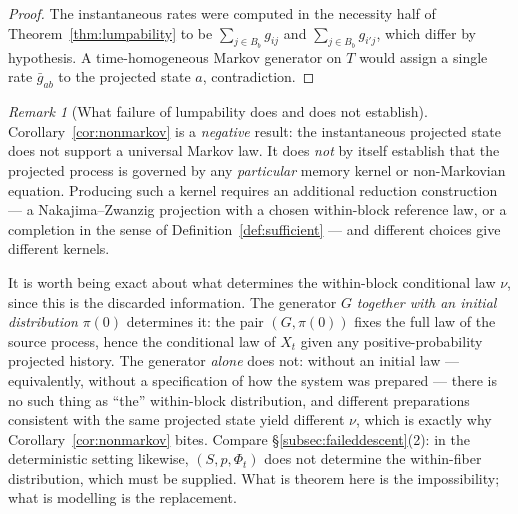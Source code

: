 \documentclass[11pt,reqno]{amsart}
\theoremstyle{plain}
\theoremstyle{definition}
\theoremstyle{remark}
\newtheorem{remark}[theorem]{Remark}
\begin{document}
\begin{proof}
The instantaneous rates were computed in the necessity half of Theorem~\ref{thm:lumpability} to be $\sum_{j\in B_b}g_{ij}$ and $\sum_{j\in B_b}g_{i'j}$, which differ by hypothesis. A time-homogeneous Markov generator on $T$ would assign a single rate $\bar g_{ab}$ to the projected state $a$, contradiction.
\end{proof}

\begin{remark}[What failure of lumpability does and does not establish]\label{rem:lumpscope}
Corollary~\ref{cor:nonmarkov} is a \emph{negative} result: the instantaneous projected state does not support a universal Markov law. It does \emph{not} by itself establish that the projected process is governed by any \emph{particular} memory kernel or non-Markovian equation. Producing such a kernel requires an additional reduction construction --- a Nakajima--Zwanzig projection with a chosen within-block reference law, or a completion in the sense of Definition~\ref{def:sufficient} --- and different choices give different kernels.

It is worth being exact about what determines the within-block conditional law $\nu$, since this is the discarded information. The generator $G$ \emph{together with an initial distribution} $\pi(0)$ determines it: the pair $(G,\pi(0))$ fixes the full law of the source process, hence the conditional law of $X_t$ given any positive-probability projected history. The generator \emph{alone} does not: without an initial law --- equivalently, without a specification of how the system was prepared --- there is no such thing as ``the'' within-block distribution, and different preparations consistent with the same projected state yield different $\nu$, which is exactly why Corollary~\ref{cor:nonmarkov} bites. Compare \S\ref{subsec:faileddescent}(2): in the deterministic setting likewise, $(S,p,\Phi_t)$ does not determine the within-fiber distribution, which must be supplied. What is theorem here is the impossibility; what is modelling is the replacement.
\end{remark}
\end{document}
